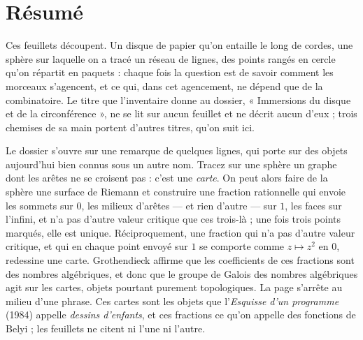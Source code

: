\documentclass[11pt,a4paper]{article}
\begin{document}
\section*{Résumé}

\begin{resume}
Ces feuillets découpent. Un disque de papier qu'on entaille le long de
cordes, une sphère sur laquelle on a tracé un réseau de lignes, des points
rangés en cercle qu'on répartit en paquets : chaque fois la question est de
savoir comment les morceaux s'agencent, et ce qui, dans cet agencement, ne
dépend que de la combinatoire. Le titre que l'inventaire donne au dossier,
« Immersions du disque et de la circonférence », ne se lit sur aucun
feuillet et ne décrit aucun d'eux ; trois chemises de sa main portent
d'autres titres, qu'on suit ici.

Le dossier s'ouvre sur une remarque de quelques lignes, qui porte sur des
objets aujourd'hui bien connus sous un autre nom. Tracez sur une sphère un
graphe dont les arêtes ne se croisent pas : c'est une \emph{carte}. On peut
alors faire de la sphère une surface de Riemann et construire une fraction
rationnelle qui envoie les sommets sur $0$, les milieux d'arêtes --- et
rien d'autre --- sur $1$, les faces sur l'infini, et n'a pas d'autre valeur
critique que ces trois-là ; une fois trois points marqués, elle est unique.
Réciproquement, une fraction qui n'a pas d'autre valeur critique, et qui en
chaque point envoyé sur $1$ se comporte comme $z \mapsto z^2$ en $0$,
redessine une carte. Grothendieck affirme que les coefficients de ces
fractions sont des nombres algébriques, et donc que le groupe de Galois des
nombres algébriques agit sur les cartes, objets pourtant purement
topologiques. La page s'arrête au milieu d'une phrase. Ces cartes sont les
objets que l'\emph{Esquisse d'un programme} (1984) appelle \emph{dessins
d'enfants}, et ces fractions ce qu'on appelle des fonctions de Belyi ; les
feuillets ne citent ni l'une ni l'autre.


\end{resume}
\end{document}
